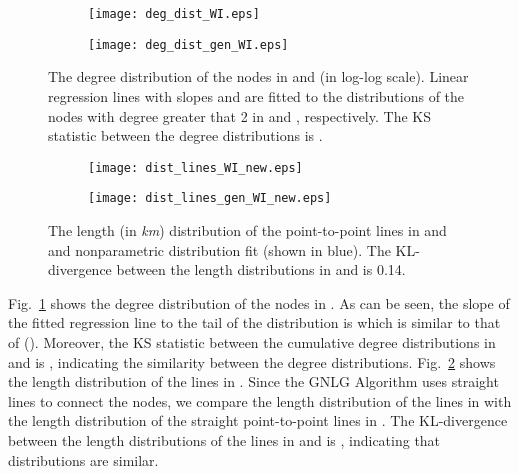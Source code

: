 \documentclass[10pt,journal]{IEEEtran}
\begin{document}
\begin{figure}[t]
\centering
\begin{subfigure}[b]{0.24\textwidth}
\vspace*{-0.2cm}
\texttt{[image: deg\_dist\_WI.eps]}
\caption{}
\vspace*{0.2cm}
\end{subfigure}
\begin{subfigure}[b]{0.24\textwidth}
\vspace*{-0.2cm}
\texttt{[image: deg\_dist\_gen\_WI.eps]}
\caption{}
\vspace*{0.2cm}
\end{subfigure}
\vspace*{-0.7cm}
\caption{The degree distribution of the nodes in  and  (in
log-log scale). Linear regression lines with slopes  and  are fitted  to
the distributions of the nodes with degree greater that 2 in  and , respectively. The KS statistic between the degree distributions is .}
\label{fig:deg_dist_gen_WI}
\vspace*{0.2cm}
\end{figure}
\begin{figure}[t]
\centering
\vspace*{-0.2cm}
\begin{subfigure}[b]{0.23\textwidth}
\vspace*{-0.2cm}
\texttt{[image: dist\_lines\_WI\_new.eps]}
\caption{}
\vspace*{0.2cm}
\end{subfigure}
\begin{subfigure}[b]{0.23\textwidth}
\vspace*{-0.2cm}
\texttt{[image: dist\_lines\_gen\_WI\_new.eps]}
\caption{}
\vspace*{0.2cm}
\end{subfigure}
\vspace{-0.4cm}
\caption{The length (in \emph{km}) distribution of the point-to-point lines in   and  and nonparametric distribution fit (shown in blue). The KL-divergence between the length distributions in  and  is 0.14.}
\label{fig:dist_lines_gen_WI}
\vspace*{0.2cm}
\end{figure}


 Fig.~\ref{fig:deg_dist_gen_WI} shows the degree distribution of the nodes in . As can be seen, the slope of the fitted regression line to the tail of the distribution is  which is similar to that of  (). Moreover, the KS statistic between the cumulative degree distributions in  and  is , indicating the similarity between the degree distributions.
Fig.~\ref{fig:dist_lines_gen_WI} shows the length distribution of the lines in . Since the GNLG Algorithm uses straight lines to connect the nodes, we compare the length distribution of the lines in  with the length distribution of the straight point-to-point lines in .  The KL-divergence between the length distributions of the lines in  and  is , indicating that  distributions are similar.
\end{document}

